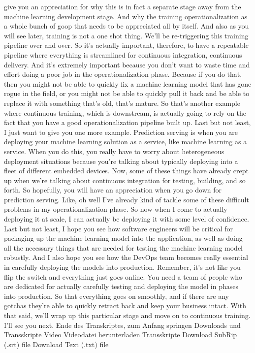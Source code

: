 {{{{    give you an appreciation for why this is in fact
    a separate stage away from the machine learning development stage.
    And why the training operationalization as a whole bunch of goop
    that needs to be appreciated all by itself.
    And also as you will see later, training is not a one shot thing.
    We'll be re-triggering this training pipeline over and over.
    So it's actually important, therefore, to have a repeatable pipeline where
    everything is streamlined for continuous integration, continuous delivery.
    And it's extremely important because you don't
    want to waste time and effort doing a poor job in the operationalization
    phase.
    Because if you do that, then you might not
    be able to quickly fix a machine learning model that has gone rogue
    in the field, or you might not be able to quickly pull it
    back and be able to replace it with something that's old, that's mature.
    So that's another example where continuous training, which
    is downstream, is actually going to rely on the fact
    that you have a good operationalization pipeline built up.
    Last but not least, I just want to give you one more example.
    Prediction serving is when you are deploying
    your machine learning solution as a service,
    like machine learning as a service.
    When you do this, you really have to worry about heterogeneous deployment
    situations because you're talking about typically
    deploying into a fleet of different embedded devices.
    Now, some of these things have already crept up
    when we're talking about continuous integration for testing, building,
    and so forth.
    So hopefully, you will have an appreciation when
    you go down for prediction serving.
    Like, oh well I've already kind of tackle
    some of these difficult problems in my operationalization phase.
    So now when I come to actually deploying it at scale,
    I can actually be deploying it with some level of confidence.
    Last but not least, I hope you see how software engineers will
    be critical for packaging up the machine learning model into the application,
    as well as doing all the necessary things that are needed for testing
    the machine learning model robustly.
    And I also hope you see how the DevOps team becomes
    really essential in carefully deploying the models into production.
    Remember, it's not like you flip the switch and everything just goes online.
    You need a team of people who are dedicated
    for actually carefully testing and deploying the model in phases
    into production.
    So that everything goes on smoothly, and if there are any gotchas
    they're able to quickly retract back and keep your business intact.
    With that said, we'll wrap up this particular stage
    and move on to continuous training.
    I'll see you next.
    Ende des Transkriptes, zum Anfang springen
    Downloads und Transskripte
    Video
    Videodatei herunterladen
    Transskripte
    Download SubRip (.srt) file
    Download Text (.txt) file
    
}}}}
